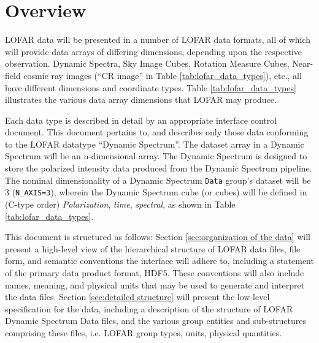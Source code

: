 \documentclass[a4paper,10pt,bibtotoc]{scrartcl}
\begin{document}



\section{Overview}
\label{sec:overview}

LOFAR data will be presented in a number of LOFAR data formats, all of
which will provide data arrays of differing dimensions, depending upon the
respective observation.  Dynamic Spectra, Sky Image Cubes, Rotation Measure
Cubes, Near-field cosmic ray images (``CR image'' in Table
\ref{tab:lofar_data_types}), etc., all have different dimensions and coordinate
types. Table  \ref{tab:lofar_data_types} illustrates the various data
array dimensions that LOFAR may produce. 



Each data type is described in detail by an appropriate interface control
document.  This document pertains to, and describes only those data conforming
to the LOFAR datatype ``Dynamic Spectrum''.  The dataset
array in a Dynamic Spectrum will be an n-dimensional array. The Dynamic
Spectrum is designed to store the polarized intensity data
produced from the Dynamic Spectrum pipeline.  The nominal dimensionality of a
Dynamic Spectrum \texttt{Data} group's dataset will be 3 (\texttt{N\_AXIS=3}),
wherein the Dynamic Spectrum cube (or cubes) will be defined in (C-type order)
\textit{Polarization}, \textit{time}, \textit{spectral}, as shown in Table
\ref{tab:lofar_data_types}.

This document is structured as follows: Section \ref{sec:organization of the data} will present
a high-level view of the hierarchical  structure of LOFAR data files, file form,
and semantic conventions the interface will adhere to, including a statement of
the primary data product format, HDF5. These conventions will also include names,
meaning, and physical units that may be used to generate and interpret the data
files.  
Section \ref{sec:detailed structure} will present the low-level
specification for the data, including a description of the structure of LOFAR
Dynamic Spectrum Data files, and the various group entities and sub-structures
comprising these files, i.e. LOFAR group types, units, physical quantities.
\end{document}
